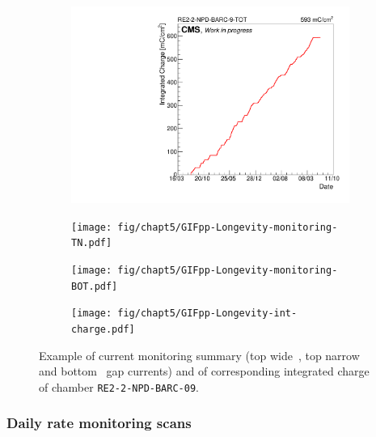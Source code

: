 	\begin{figure}[H]
    	\begin{subfigure}{0.5\linewidth}
			\centering
    		\includegraphics[width = \linewidth]{fig/chapt5/GIFpp-Longevity-monitoring-TW.pdf}
        	\caption{\label{fig:Longevity:A}}
    	\end{subfigure}
    	\begin{subfigure}{0.5\linewidth}
			\centering
    		\texttt{[image: fig/chapt5/GIFpp-Longevity-monitoring-TN.pdf]}
        	\caption{\label{fig:Longevity:B}}
    	\end{subfigure}
    	\begin{subfigure}{0.5\linewidth}
			\centering
    		\texttt{[image: fig/chapt5/GIFpp-Longevity-monitoring-BOT.pdf]}
        	\caption{\label{fig:Longevity:C}}
    	\end{subfigure}
    	\begin{subfigure}{0.5\linewidth}
			\centering
    		\texttt{[image: fig/chapt5/GIFpp-Longevity-int-charge.pdf]}
        	\caption{\label{fig:Longevity:D}}
    	\end{subfigure}
		\caption{\label{fig:Longevity} Example of current monitoring summary (top wide~, top narrow~ and bottom~ gap currents) and of corresponding integrated charge~ of chamber \texttt{RE2-2-NPD-BARC-09}.}
	\end{figure}
\vfill
	
\newpage
	
		\subsubsection{Daily rate monitoring scans}
		\label{chapt5:sssec:dailyratescan}
	
